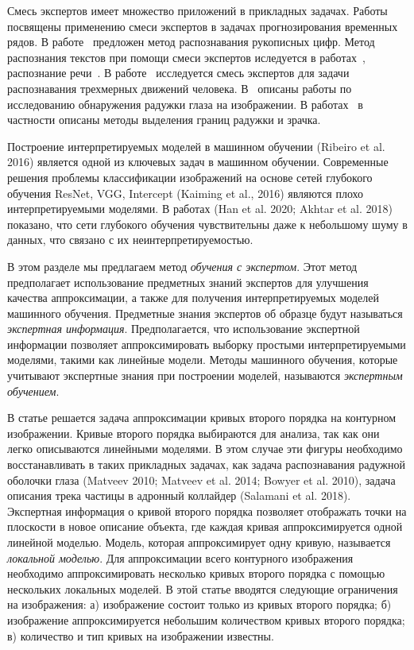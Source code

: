Смесь экспертов имеет множество приложений в прикладных задачах. Работы~\cite{Yumlu2003, Cheung1995, Weigend2000} посвящены применению смеси экспертов в задачах прогнозирования временных рядов. 
В работе~\cite{Ebrahimpour2009} предложен метод распознавания рукописных цифр. 
Метод распознания текстов при помощи смеси экспертов иследуется в работах~\cite{Estabrooks2001}, распознание речи~\cite{Mossavat2010, Peng1996, Tuerk2001}. 
В работе~\cite{Sminchisescu2007} исследуется смесь экспертов для задачи распознавания трехмерных движений человека. 
В~\cite{Bowyer2010} описаны работы по исследованию обнаружения радужки глаза на изображении. В работах~\cite{Matveev2010, Matveev2014} в частности описаны методы выделения границ радужки и зрачка.

Построение интерпретируемых моделей в машинном обучении (Ribeiro et al. 2016) является одной из ключевых задач в машинном обучении.
Современные решения проблемы классификации изображений на основе сетей глубокого обучения ResNet, VGG, Intercept (Kaiming et al., 2016) являются плохо интерпретируемыми моделями.
В работах (Han et al. 2020; Akhtar et al. 2018)  показано, что сети глубокого обучения чувствительны даже к небольшому шуму в данных, что связано с их неинтерпретируемостью.

В этом разделе мы предлагаем метод \textit{обучения с экспертом}.
Этот метод предполагает использование предметных знаний экспертов для улучшения качества аппроксимации, а также для получения интерпретируемых моделей машинного обучения.
Предметные знания экспертов об образце будут называться \textit{экспертная информация}.
Предполагается, что использование экспертной информации позволяет аппроксимировать выборку простыми интерпретируемыми моделями, такими как линейные модели. Методы машинного обучения, которые учитывают экспертные знания при построении моделей, называются \textit{экспертным обучением}.


В статье решается задача аппроксимации кривых второго порядка на контурном изображении. Кривые второго порядка выбираются для анализа, так как они легко описываются линейными моделями. В этом случае эти фигуры необходимо восстанавливать в таких прикладных задачах, как задача распознавания радужной оболочки глаза (Matveev 2010; Matveev et al. 2014; Bowyer et al. 2010), задача описания трека частицы в адронный коллайдер (Salamani et al. 2018). Экспертная информация о кривой второго порядка позволяет отображать точки на плоскости в новое описание объекта, где каждая кривая аппроксимируется одной линейной моделью. Модель, которая аппроксимирует одну кривую, называется \textit{локальной моделью}. Для аппроксимации всего контурного изображения необходимо аппроксимировать несколько кривых второго порядка с помощью нескольких локальных моделей. В этой статье вводятся следующие ограничения на изображения: а) изображение состоит только из кривых второго порядка; б) изображение аппроксимируется небольшим количеством кривых второго порядка; в) количество и тип кривых на изображении известны.

